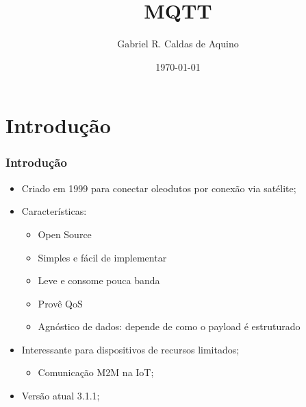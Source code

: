\documentclass{beamer}
\title[MQTT]{MQTT} %
\author{Gabriel R. Caldas de Aquino} %
\institute[UFRJ] %
{
Universidade Federal do Rio de Janeiro \\ %
\medskip
\textit{gabriel@labnet.nce.ufrj.br} %
}
\date{\today} %
\begin{document}
\begin{frame}
\titlepage %
\end{frame}



\section{Introdu\c{c}\~ao} %


\begin{frame}
\frametitle{Introdu\c{c}\~ao}
\begin{itemize}
\item Criado em 1999 para conectar oleodutos por conex\~{a}o via sat\'{e}lite;
\item Caracter\'{i}sticas:
	\begin{itemize}
	\item Open Source
    \item Simples e f\'{a}cil de implementar
    \item Leve e consome pouca banda
    \item Prov\^{e} QoS
    \item Agn\'{o}stico de dados: depende de como o payload é estruturado
	\end{itemize}

\item Interessante para dispositivos de recursos limitados;
	\begin{itemize}
	\item Comunica\c{c}\~{a}o M2M na IoT;
	\end{itemize}

\item Versão atual 3.1.1;


\end{itemize}
\end{frame}
\end{document}
